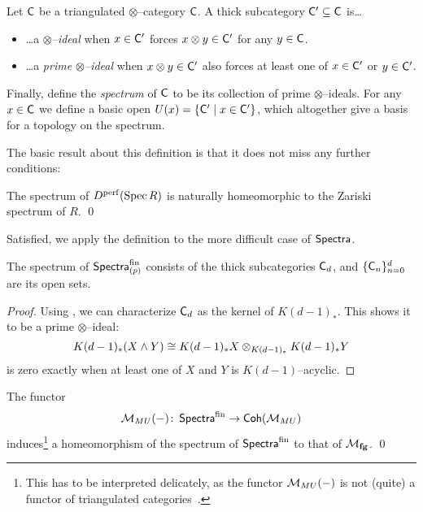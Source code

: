 \begin{definition}
Let $\mathsf{C}$ be a triangulated $\otimes$--category $\mathsf{C}$.  A thick subcategory $\mathsf{C}' \subseteq \mathsf{C}$ is\ldots
\begin{itemize}
\item \ldots a \textit{$\otimes$--ideal} when $x \in \mathsf{C}'$ forces $x \otimes y \in \mathsf{C}'$ for any $y \in \mathsf{C}$.
\item \ldots a \textit{prime $\otimes$--ideal} when $x \otimes y \in \mathsf{C}'$ also forces at least one of $x \in \mathsf{C}'$ or $y \in \mathsf{C}'$.
\end{itemize}
Finally, define the \textit{spectrum} of $\mathsf{C}$ to be its collection of prime $\otimes$--ideals.  For any $x \in \mathsf{C}$ we define a basic open $U(x) = \{\mathsf{C}' \mid x \in \mathsf{C}'\}$, which altogether give a basis for a topology on the spectrum.
\end{definition}

The basic result about this definition is that it does not miss any further conditions:

\begin{theorem}
The spectrum of $D^{\mathrm{perf}}(\operatorname{Spec} R)$ is naturally homeomorphic to the Zariski spectrum of $R$. \qed
\end{theorem}

\noindent Satisfied, we apply the definition to the more difficult case of $\mathsf{Spectra}$.

\begin{theorem}
The spectrum of $\mathsf{Spectra}_{(p)}^{\mathrm{fin}}$ consists of the thick subcategories $\mathsf{C}_d$, and $\{\mathsf{C}_n\}_{n=0}^d$ are its open sets.
\end{theorem}
\begin{proof}
Using , we can characterize $\mathsf{C}_d$ as the kernel of $K(d-1)_*$.  This shows it to be a prime $\otimes$--ideal: \[K(d-1)_*(X \wedge Y) \cong K(d-1)_* X \otimes_{K(d-1)_*} K(d-1)_* Y\] is zero exactly when at least one of $X$ and $Y$ is $K(d-1)$--acyclic.
\end{proof}

\begin{corollary}
The functor \[\mathcal{M}_{MU}(-)\colon\thinspace \mathsf{Spectra}^{\mathrm{fin}} \to \mathsf{Coh}(\mathcal{M}_{MU})\] induces\footnote{This has to be interpreted delicately, as the functor $\mathcal{M}_{MU}(-)$ is not (quite) a functor of triangulated categories~\cite[2.4.2]{MoravaCplxBordismInAT}.} a homeomorphism of the spectrum of $\mathsf{Spectra}^{\mathrm{fin}}$ to that of $\mathcal{M}_{\mathbf{fg}}$. \qed
\end{corollary}

